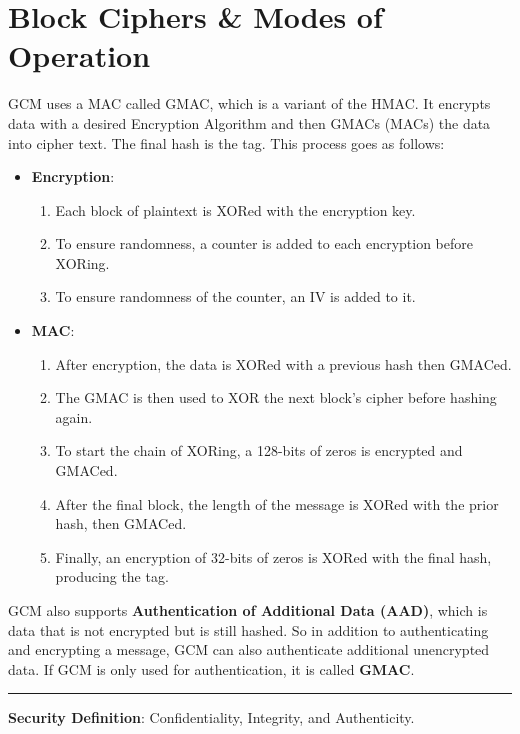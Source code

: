 \section{Block Ciphers \& Modes of Operation}
\begin{Def}

    \label{theo:gcm}
    GCM uses a MAC called GMAC, which is a variant of the HMAC. It encrypts data 
    with a desired Encryption Algorithm and then GMACs (MACs) the data into cipher text. The final hash is the tag. This 
    process goes as follows:
    \begin{itemize}
        \item \textbf{Encryption}:
        \begin{enumerate}
            \item Each block of plaintext is XORed with the encryption key.
            \item To ensure randomness, a counter is added to each encryption before XORing.
            \item To ensure randomness of the counter, an IV is added to it.
        \end{enumerate}
        \item \textbf{MAC}:
        \begin{enumerate}
            \item After encryption, the data is XORed with a previous hash then GMACed.
            \item The GMAC is then used to XOR the next block's cipher before hashing again.
            \item To start the chain of XORing, a 128-bits of zeros is encrypted and GMACed.
            \item After the final block, the length of the message is XORed with the prior hash, then GMACed.
            \item Finally, an encryption of 32-bits of zeros is XORed with the final hash, producing the tag.
        \end{enumerate}
    \end{itemize}

    \noindent
    GCM also supports \textbf{Authentication of Additional Data (AAD)}, which is data that is not encrypted but is still hashed.
    So in addition to authenticating and encrypting a message, GCM can also authenticate additional unencrypted data.
    If GCM is only used for authentication, it is called \textbf{GMAC}. \hfill \cite{vidder_gcm_gmac}
    \noindent
    \rule{\textwidth}{0.4pt}
    \textbf{Security Definition}: Confidentiality, Integrity, and Authenticity.
\end{Def}

